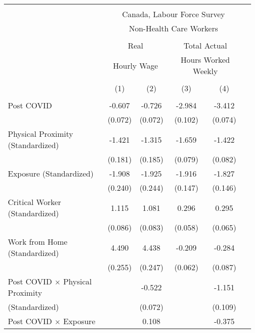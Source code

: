 \begin{tabular*}{\textwidth}{ @{\extracolsep{\fill}}l*{5}{c}}
\hline\hline
\\
 &\multicolumn{4}{c}{Canada, Labour Force Survey} \\
 &\multicolumn{4}{c}{Non-Health Care Workers} \\
\cline{2-5} \\
&\multicolumn{2}{c}{Real} &\multicolumn{2}{c}{Total Actual} \\
&\multicolumn{2}{c}{Hourly Wage} &\multicolumn{2}{c}{Hours Worked Weekly} \\
\cline{2-3} \cline{4-5} \\
                                             &\multicolumn{1}{c}{(1)}     &\multicolumn{1}{c}{(2)}     &\multicolumn{1}{c}{(3)}     &\multicolumn{1}{c}{(4)}\\
\hline
\\
Post COVID                                   &-0.607     &-0.726     &-2.984     &-3.412\\
                                             &(0.072)     &(0.072)     &(0.102)     &(0.074)\\[0.5em]
%
Physical Proximity (Standardized)            &-1.421     &-1.315     &-1.659     &-1.422\\
                                             &(0.181)     &(0.185)     &(0.079)     &(0.082)\\[0.5em]
%
Exposure (Standardized)                      &-1.908     &-1.925     &-1.916     &-1.827\\
                                             &(0.240)     &(0.244)     &(0.147)     &(0.146)\\[0.5em]
%
Critical Worker (Standardized)               &1.115     &1.081     &0.296     &0.295\\
                                             &(0.086)     &(0.083)     &(0.058)     &(0.065)\\[0.5em]
%
Work from Home (Standardized)                &4.490     &4.438     &-0.209     &-0.284\\
                                             &(0.255)     &(0.247)     &(0.062)     &(0.087)\\[0.5em]
%
Post COVID $\times$ Physical Proximity       &         &-0.522     &         &-1.151\\
(Standardized)                               &         &(0.072)     &         &(0.109)\\[0.5em]
%
Post COVID $\times$ Exposure                 &         &0.108     &         &-0.375\\

\end{tabular*}
